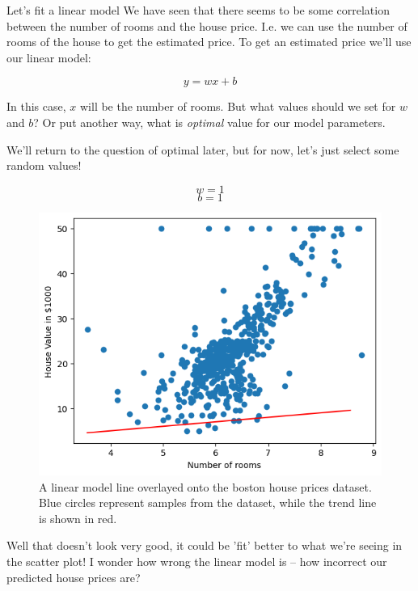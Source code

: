 \documentclass[10pt]{beamer}
\begin{document}
\begin{frame}[fragile,allowframebreaks,label=]{Let's fit a linear model}
We have seen that there seems to be some correlation between the number of rooms and
the house price. I.e. we can use the number of rooms of the house to get the
estimated price. To get an estimated price we'll use our linear model:

\[
y = w x + b
\]

In this case, \(x\) will be the number of rooms. But what values should we set for \(w\)
and \(b\)? Or put another way, what is \emph{optimal} value for our model parameters.

We'll return to the question of optimal later, but for now, let's just select some
random values!

\[
w = 1
\]
\[
b = 1
\]

\begin{figure}[htbp]
\centering
\includegraphics[width=.9\linewidth]{images/boston_rm_first_pred.png}
\caption{A linear model line overlayed onto the boston house prices dataset. Blue circles represent samples from the dataset, while the trend line is shown in red.}
\end{figure}

Well that doesn't look very good, it could be 'fit' better to what we're seeing in
the scatter plot! I wonder how wrong the linear model is -- how incorrect our
predicted house prices are?
\end{frame}
\end{document}

